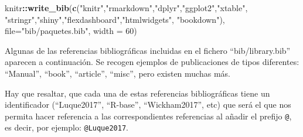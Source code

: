 \documentclass[12pt,a4paper,]{book}
\newenvironment{Shaded}{\begin{snugshade}}{\end{snugshade}}
\newcommand{\AttributeTok}[1]{\textcolor[rgb]{0.13,0.29,0.53}{#1}}
\newcommand{\DecValTok}[1]{\textcolor[rgb]{0.00,0.00,0.81}{#1}}
\newcommand{\FunctionTok}[1]{\textcolor[rgb]{0.13,0.29,0.53}{\textbf{#1}}}
\newcommand{\NormalTok}[1]{#1}
\newcommand{\SpecialCharTok}[1]{\textcolor[rgb]{0.81,0.36,0.00}{\textbf{#1}}}
\newcommand{\StringTok}[1]{\textcolor[rgb]{0.31,0.60,0.02}{#1}}
\numberwithin{dummy}{section}
\theoremstyle{ocrenumbox}
\theoremstyle{blacknumex}
\theoremstyle{blacknumbox}
\theoremstyle{ocrenum}
\theoremstyle{ocrenum}
\begin{document}
\bigskip

\begin{Shaded}
\begin{Highlighting}[]
\NormalTok{knitr}\SpecialCharTok{::}\FunctionTok{write\_bib}\NormalTok{(}\FunctionTok{c}\NormalTok{(}\StringTok{"knitr"}\NormalTok{,}\StringTok{"rmarkdown"}\NormalTok{,}\StringTok{"dplyr"}\NormalTok{,}\StringTok{"ggplot2"}\NormalTok{,}\StringTok{"xtable"}\NormalTok{,}
                   \StringTok{"stringr"}\NormalTok{,}\StringTok{"shiny"}\NormalTok{,}\StringTok{"flexdashboard"}\NormalTok{,}\StringTok{"htmlwidgets"}\NormalTok{,}
                   \StringTok{"bookdown"}\NormalTok{),}
                 \AttributeTok{file=}\StringTok{"bib/paquetes.bib"}\NormalTok{, }
                 \AttributeTok{width =} \DecValTok{60}\NormalTok{)}
\end{Highlighting}
\end{Shaded}

Algunas de las referencias bibliográficas incluidas en el fichero
``bib/library.bib'' aparecen a continuación. Se recogen ejemplos de
publicaciones de tipos diferentes: ``Manual'', ``book'', ``article'',
``misc'', pero existen muchas más.

Hay que resaltar, que cada una de estas referencias bibliográficas tiene
un identificador (``Luque2017'', ``R-base'', ``Wickham2017'', etc) que
será el que nos permita hacer referencia a las correspondientes
referencias al añadir el prefijo \texttt{@}, es decir, por ejemplo:
\texttt{@Luque2017}.
\end{document}
